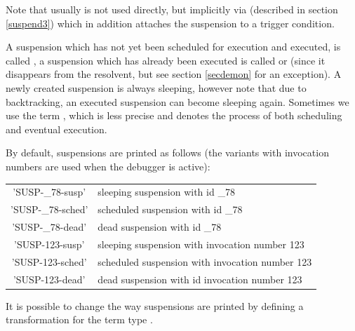 {Note that usually
is not used directly, but implicitly via
(described in section \ref{suspend3}) which in addition attaches the suspension
to a
trigger condition.

A suspension which has not yet been scheduled
for execution and executed, is called
,
a suspension which has already been executed is called
or
(since it disappears from the resolvent,
but see section \ref{secdemon} for an exception).
A newly created suspension is always sleeping, however
note that due to backtracking, an executed suspension
can become sleeping again.
Sometimes we use the term
,
which is less precise and
denotes the process of both scheduling and eventual execution.


By default, suspensions are printed as follows (the variants with invocation
numbers are used when the debugger is active):
\begin{center}
\begin{tabular}{|c|l|}
\hline
'SUSP-_78-susp'		&   sleeping suspension with id _78 \\
'SUSP-_78-sched'	&   scheduled suspension with id _78 \\
'SUSP-_78-dead'		&   dead suspension with id _78 \\
\hline
'SUSP-123-susp'		&   sleeping suspension with invocation number 123 \\
'SUSP-123-sched'	&   scheduled suspension with invocation number 123 \\
'SUSP-123-dead'		&   dead suspension with id invocation number 123 \\
\hline
\end{tabular}
\end{center}
It is possible to change the way suspensions are printed by defining a
transformation for the term type .



}
